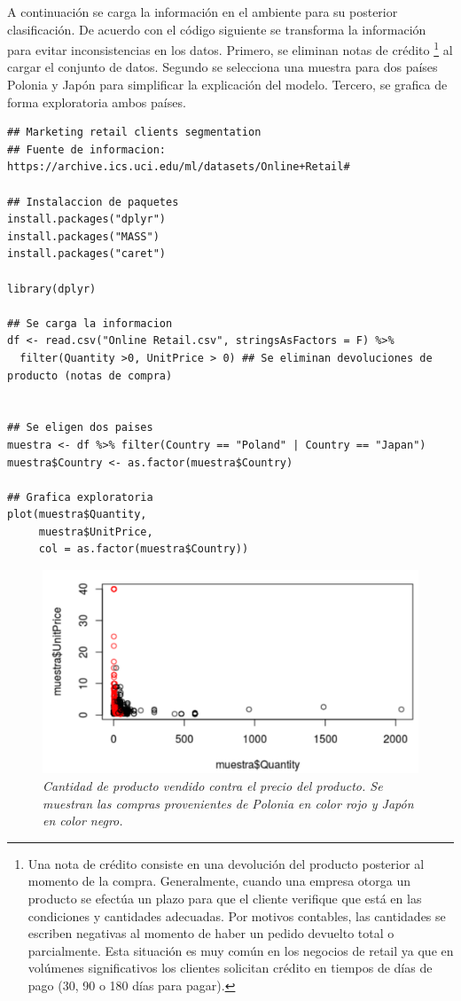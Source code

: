 \documentclass[letterpaper,12pt, spanish, oneside]{book} %
\let\oldfootnote\footnote
\renewcommand{\footnote}[1]{%
  \begingroup%
  \linespread{1.2}%
  \oldfootnote{#1}%
  \endgroup%
}
\begin{document}
A continuación se carga la información en el ambiente para su posterior clasificación. De acuerdo con el código siguiente se transforma la información para evitar inconsistencias en los datos. Primero, se eliminan notas de crédito\footnote{ Una nota de crédito consiste en una devolución del producto posterior al momento de la compra. Generalmente, cuando una empresa otorga un producto se efectúa un plazo para que el cliente verifique que está en las condiciones y cantidades adecuadas. Por motivos contables, las cantidades se escriben negativas al momento de haber un pedido devuelto total o parcialmente. Esta situación es muy común en los negocios de retail ya que en volúmenes significativos los clientes solicitan crédito en tiempos de días de pago (30, 90 o 180 días para pagar).} al cargar el conjunto de datos. Segundo se selecciona una muestra para dos países Polonia y Japón para simplificar la explicación del modelo. Tercero, se grafica de forma exploratoria ambos países.

\begin{lstlisting}
## Marketing retail clients segmentation
## Fuente de informacion: https://archive.ics.uci.edu/ml/datasets/Online+Retail#

## Instalaccion de paquetes
install.packages("dplyr")
install.packages("MASS")
install.packages("caret")

library(dplyr)

## Se carga la informacion
df <- read.csv("Online Retail.csv", stringsAsFactors = F) %>% 
  filter(Quantity >0, UnitPrice > 0) ## Se eliminan devoluciones de producto (notas de compra)


## Se eligen dos paises
muestra <- df %>% filter(Country == "Poland" | Country == "Japan")
muestra$Country <- as.factor(muestra$Country)

## Grafica exploratoria
plot(muestra$Quantity, 
     muestra$UnitPrice, 
     col = as.factor(muestra$Country))
\end{lstlisting}

\begin{figure}[H]
\centering
\includegraphics[width=1\textwidth]{marketing1.png}
\caption{\label{fig:frog2}\textit{Cantidad de producto vendido contra el precio del producto. Se muestran las compras provenientes de Polonia en color rojo y Japón en color negro.}}
\end{figure}
\end{document}
